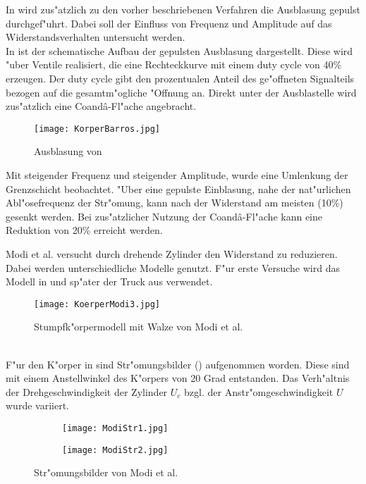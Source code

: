 In \cite{Barros.2016} wird zus"atzlich zu den vorher beschriebenen Verfahren die Ausblasung gepulst durchgef"uhrt. Dabei soll der Einfluss von Frequenz und Amplitude auf das Widerstandsverhalten untersucht werden.\\
In  ist der schematische Aufbau der gepulsten Ausblasung dargestellt. Diese wird "uber Ventile realisiert, die eine Rechteckkurve mit einem duty cycle von 40\% erzeugen. Der duty cycle gibt den prozentualen Anteil des ge"offneten Signalteils bezogen auf die gesamtm"ogliche "Offnung an. Direkt unter der Ausblastelle wird zus"atzlich eine Coand\^{a}-Fl"ache angebracht.\\
\begin{figure}[h]
	\centering
	\texttt{[image: KorperBarros.jpg]}
	\caption{Ausblasung von \cite{Barros.2016}}
	\label{fig:Barros}
\end{figure}
Mit steigender Frequenz und steigender Amplitude, wurde eine Umlenkung der Grenzschicht beobachtet. "Uber eine gepulste Einblasung, nahe der nat"urlichen Abl"osefrequenz der Str"omung, kann nach \cite{Barros.2016} der Widerstand am meisten (10\%) gesenkt werden. Bei zus"atzlicher Nutzung der Coand\^{a}-Fl"ache kann eine Reduktion von 20\% erreicht werden.

Modi et al. \cite{MODI.1991} versucht durch drehende Zylinder den Widerstand zu reduzieren. Dabei werden unterschiedliche Modelle genutzt. F"ur erste Versuche wird das Modell in  und sp"ater der Truck aus  verwendet.
\begin{figure}[h]
	\centering
	\texttt{[image: KoerperModi3.jpg]}
	\caption{Stumpfk"orpermodell mit Walze von Modi et al. \cite{MODI.1991}}
	\label{fig:Modi3}
\end{figure}\\
F"ur den K"orper in  sind Str"omungsbilder () aufgenommen worden. Diese sind mit einem Anstellwinkel des K"orpers von 20 Grad entstanden. Das Verh"altnis der Drehgeschwindigkeit der Zylinder \(U_c\) bzgl. der Anstr"omgeschwindigkeit \(U\) wurde variiert.\\
\begin{figure}[h]
	\centering
	\begin{subfigure}[c]{0.4\textwidth}		
		\texttt{[image: ModiStr1.jpg]}
	\end{subfigure}
	\begin{subfigure}[c]{0.4\textwidth}
		\texttt{[image: ModiStr2.jpg]}
	\end{subfigure}
	\caption{Str"omungsbilder von Modi et al. \cite{MODI.1991}}
	\label{fig:ModiStr}
\end{figure}

